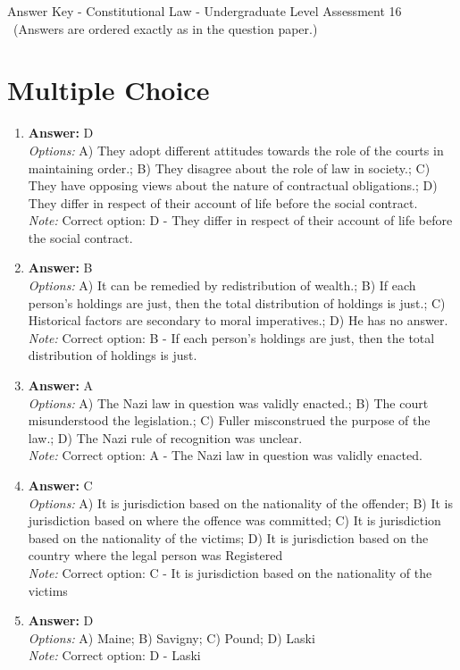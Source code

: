 \documentclass[12pt]{article}
\begin{document}
\begin{center}
Answer Key - Constitutional Law - Undergraduate Level Assessment 16 \
\small (Answers are ordered exactly as in the question paper.)
\end{center}

\section*{Multiple Choice}
\begin{enumerate}[label=\arabic*.]
\item \textbf{Answer:} D
\\ \textit{Options:} A) They adopt different attitudes towards the role of the courts in maintaining order.; B) They disagree about the role of law in society.; C) They have opposing views about the nature of contractual obligations.; D) They differ in respect of their account of life before the social contract.
\\ \textit{Note:} Correct option: D - They differ in respect of their account of life before the social contract.
\item \textbf{Answer:} B
\\ \textit{Options:} A) It can be remedied by redistribution of wealth.; B) If each person's holdings are just, then the total distribution of holdings is just.; C) Historical factors are secondary to moral imperatives.; D) He has no answer.
\\ \textit{Note:} Correct option: B - If each person's holdings are just, then the total distribution of holdings is just.
\item \textbf{Answer:} A
\\ \textit{Options:} A) The Nazi law in question was validly enacted.; B) The court misunderstood the legislation.; C) Fuller misconstrued the purpose of the law.; D) The Nazi rule of recognition was unclear.
\\ \textit{Note:} Correct option: A - The Nazi law in question was validly enacted.
\item \textbf{Answer:} C
\\ \textit{Options:} A) It is jurisdiction based on the nationality of the offender; B) It is jurisdiction based on where the offence was committed; C) It is jurisdiction based on the nationality of the victims; D) It is jurisdiction based on the country where the legal person was Registered
\\ \textit{Note:} Correct option: C - It is jurisdiction based on the nationality of the victims
\item \textbf{Answer:} D
\\ \textit{Options:} A) Maine; B) Savigny; C) Pound; D) Laski
\\ \textit{Note:} Correct option: D - Laski
\end{enumerate}
\end{document}
